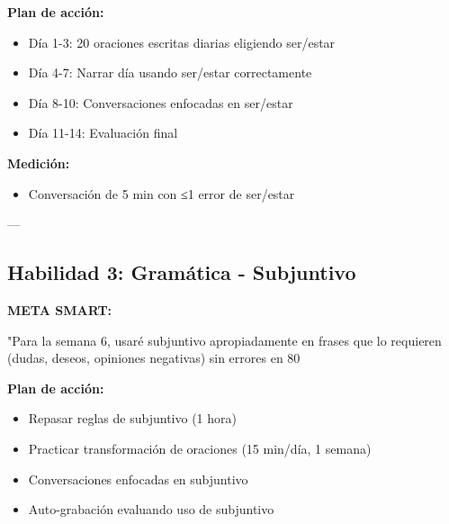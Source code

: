 \documentclass[a4paper,11pt]{article}
\begin{document}
\vspace{0.2cm}

\textbf{Plan de acción:}

\begin{itemize}

  \item Día 1-3: 20 oraciones escritas diarias eligiendo ser/estar

  \item Día 4-7: Narrar día usando ser/estar correctamente

  \item Día 8-10: Conversaciones enfocadas en ser/estar

  \item Día 11-14: Evaluación final

\end{itemize}

\vspace{0.2cm}

\textbf{Medición:}

\begin{itemize}

  \item [ ] Conversación de 5 min con ≤1 error de ser/estar

\end{itemize}

\vspace{0.2cm}

---

\vspace{0.2cm}

\subsection{Habilidad 3: Gramática - Subjuntivo}

\vspace{0.2cm}

\textbf{META SMART:}

"Para la semana 6, usaré subjuntivo apropiadamente en frases que lo requieren (dudas, deseos, opiniones negativas) sin errores en 80%

\vspace{0.2cm}

\textbf{Plan de acción:}

\begin{itemize}

  \item Repasar reglas de subjuntivo (1 hora)

  \item Practicar transformación de oraciones (15 min/día, 1 semana)

  \item Conversaciones enfocadas en subjuntivo

  \item Auto-grabación evaluando uso de subjuntivo

\end{itemize}
\end{document}
